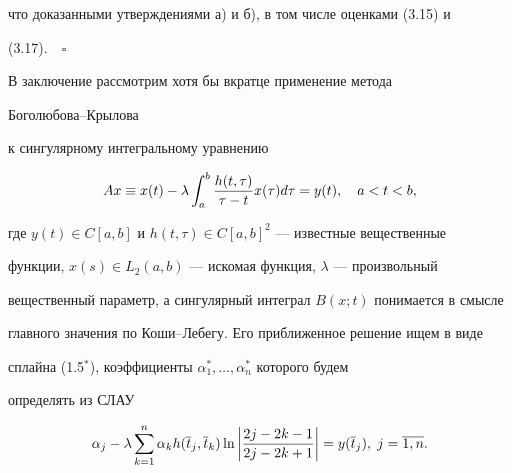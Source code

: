 что доказанными утверждениями а) и б), в том числе оценками (3.15) и


(3.17).$\quad\square$





В заключение рассмотрим хотя бы вкратце применение метода


Боголюбова--Крылова


к сингулярному интегральному уравнению


\begin{equation}


Ax\equiv x(t)-\lambda \intl_a^b \frac{h(t,\tau)}{\tau-t}x(\tau)d\tau = y(t),


\quad a<t<b,


\end{equation}


где $y(t)\in C[a,b]$ и $h(t,\tau)\in C[a,b]^2$ --- известные вещественные


функции, $x(s)\in L_2(a,b)$ --- искомая функция, $\lambda$ --- произвольный


вещественный параметр, а сингулярный интеграл $B(x;t)$ понимается в смысле


главного значения по Коши--Лебегу. Его приближенное решение ищем в виде


сплайна (1.5$^*$), коэффициенты $\alpha_1^*,\dotsc,\alpha_n^*$ которого будем


определять из СЛАУ


\begin{equation}


\alpha_j - \lambda \sum_{k=1}^n\alpha_k h (\ol{t}_j, \ol{t}_k) \ln


\left| \frac{2j-2k-1}{2j-2k+1}\right| = y(\ol{t}_j),\; j=\ol{1,n}.


\end{equation}





